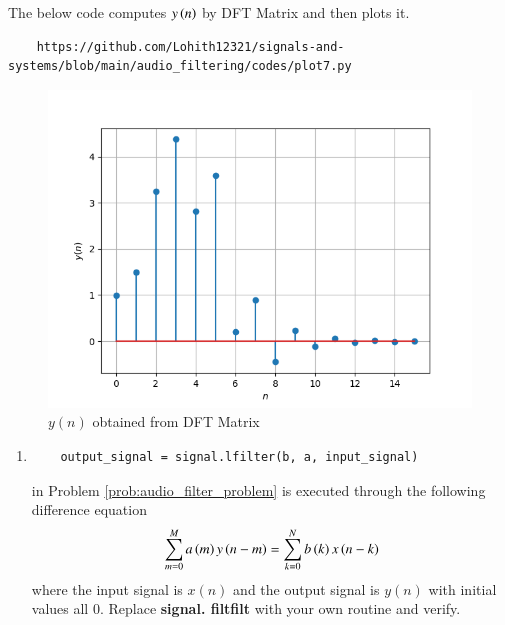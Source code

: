 \documentclass[journal,12pt,twocolumn]{IEEEtran}
\theoremstyle{remark}
\begin{document}
\begin{enumerate}[label=\thesection.\arabic*
,ref=\thesection.\theenumi]
\begin{enumerate}[label=\thesection.\arabic*
,ref=\thesection.\theenumi]
The below code computes $y\left(n\right)$ by DFT Matrix and then plots it.\\
\begin{lstlisting}
    https://github.com/Lohith12321/signals-and-systems/blob/main/audio_filtering/codes/plot7.py
\end{lstlisting}
\begin{figure}[ht]
\centering
\includegraphics[width=\columnwidth]{figs/plot7.png}
\caption{$y(n)$ obtained from DFT Matrix}
\label{fig:plot6}
\end{figure}
\end{enumerate}
\begin{enumerate}[label=\thesection.\arabic*
,ref=\thesection.\theenumi]
\section{Exercises}
Answer the following questions by looking at the python code in Problem \ref{prob:audio_filter_problem}.
\item
\begin{lstlisting}
	output_signal = signal.lfilter(b, a, input_signal)
\end{lstlisting}
in Problem \ref{prob:audio_filter_problem} is executed through the following difference equation
\begin{equation}
\label{eq:iir_filter_gen}
 \sum _{m=0}^{M}a\left(m\right)y\left(n-m\right)=\sum _{k=0}^{N}b\left(k\right)x\left(n-k\right) 
\end{equation}
%
where the input signal is $x(n)$ and the output signal is $y(n)$ with initial values all 0. Replace
\textbf{signal. filtfilt} with your own routine and verify.\\


\end{enumerate}
\end{enumerate}
\end{document}
